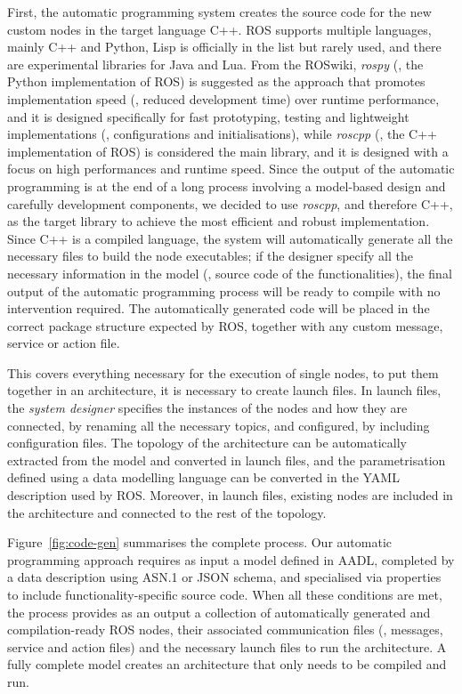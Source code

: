 First, the automatic programming system creates the source code for the new custom nodes in the target language C++. ROS supports multiple languages, mainly C++ and Python, Lisp is officially in the list but rarely used, and there are experimental libraries for Java and Lua. From the ROSwiki, \textit{rospy} (\ie, the Python implementation of ROS) is suggested as the approach that promotes implementation speed (\ie, reduced development time) over runtime performance, and it is designed specifically for fast prototyping, testing and lightweight implementations (\eg, configurations and initialisations), while \textit{roscpp} (\ie, the C++ implementation of ROS) is considered the main library, and it is designed with a focus on high performances and runtime speed. Since the output of the automatic programming is at the end of a long process involving a model-based design and carefully development components, we decided to use \textit{roscpp}, and therefore C++, as the target library to achieve the most efficient and robust implementation. Since C++ is a compiled language, the system will automatically generate all the necessary files to build the node executables; if the designer specify all the necessary information in the model (\ie, source code of the functionalities), the final output of the automatic programming process will be ready to compile with no intervention required. The automatically generated code will be placed in the correct package structure expected by ROS, together with any custom message, service or action file.

This covers everything necessary for the execution of single nodes, to put them together in an architecture, it is necessary to create launch files. In launch files, the \textit{system designer} specifies the instances of the nodes and how they are connected, by renaming all the necessary topics, and configured, by including configuration files. The topology of the architecture can be automatically extracted from the model and converted in launch files, and the parametrisation defined using a data modelling language can be converted in the YAML description used by ROS. Moreover, in launch files, existing nodes are included in the architecture and connected to the rest of the topology.

Figure~\ref{fig:code-gen} summarises the complete process. Our automatic programming approach requires as input a model defined in AADL, completed by a data description using ASN.1 or JSON schema, and specialised via properties to include functionality-specific source code. When all these conditions are met, the process provides as an output a collection of automatically generated and compilation-ready ROS nodes, their associated communication files (\ie, messages, service and action files) and the necessary launch files to run the architecture. A fully complete model creates an architecture that only needs to be compiled and run.

